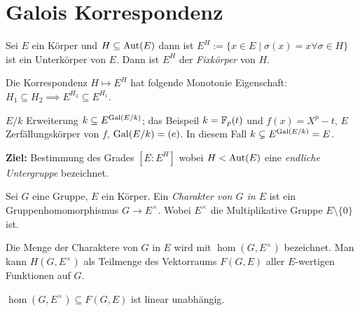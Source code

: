 \graphicspath{{Images/}}

\chapter{Galois Korrespondenz}

\begin{definition}
	Sei $E$ ein Körper und $H \subseteq \operatorname{Aut}(E)$ dann ist $E^{H} := \{x \in E \mid \sigma(x) = x \forall \sigma \in H\} $ ist ein Unterkörper von $E$.
	Dann ist $E^{H}$ der \emph{Fixkörper} von $H$.
\end{definition}

\begin{remark}
	Die Korrespondenz $H \mapsto E^{H}$ hat folgende Monotonie Eigenschaft: $H_1 \subseteq H_2 \implies E^{H_2} \subseteq E^{H_1}$.
\end{remark}

\begin{eg}
	$E / k$ Erweiterung $k \subseteq E^{\operatorname{Gal}(E / k)}$; das Beispeil $k = \mathbb{F}_{p}(t)$ und $f(x) = X^{p}-t$, $E$ Zerfällungskörper von $f$, $\operatorname{Gal}(E / k) = (e)$.
	In diesem Fall $k \subsetneq E^{\operatorname{Gal}(E / k)} = E$.
\end{eg}

\textbf{Ziel:} Bestimmung des Grades $[E : E^{H}]$ wobei $H < \operatorname{Aut}(E)$ eine \emph{endliche Untergruppe} bezeichnet.

\begin{definition}
	Sei $G$ eine Gruppe, $E$ ein Körper.
	Ein \emph{Charakter von $G$ in $E$} ist ein Gruppenhomomorphismus $G \to E^{\times}$.
	Wobei $E^{\times}$ die Multiplikative Gruppe $E \setminus \{0\}$ ist.

	Die Menge der Charaktere von $G$ in $E$ wird mit $\hom(G,E^{\times})$ bezeichnet.
	Man kann $H(G,E^{\times})$ als Teilmenge des Vektorraums $F(G,E)$ aller $E$-wertigen Funktionen auf $G$.
\end{definition}

\begin{proposition}[Dedekind]
	$\hom(G,E^{\times}) \subseteq F(G,E)$ ist linear unabhängig.
\end{proposition}

